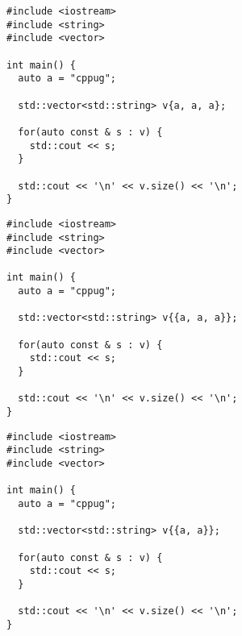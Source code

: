 \begin{frame}[fragile]
  \begin{lstlisting}
#include <iostream>
#include <string>
#include <vector>

int main() {
  auto a = "cppug";

  std::vector<std::string> v{a, a, a};

  for(auto const & s : v) {
    std::cout << s;
  }

  std::cout << '\n' << v.size() << '\n';
}
  \end{lstlisting}
\end{frame}
\begin{frame}[fragile]
  \begin{lstlisting}
#include <iostream>
#include <string>
#include <vector>

int main() {
  auto a = "cppug";

  std::vector<std::string> v{{a, a, a}};

  for(auto const & s : v) {
    std::cout << s;
  }

  std::cout << '\n' << v.size() << '\n';
}
  \end{lstlisting}
\end{frame}
\begin{frame}[fragile]
  \begin{lstlisting}
#include <iostream>
#include <string>
#include <vector>

int main() {
  auto a = "cppug";

  std::vector<std::string> v{{a, a}};

  for(auto const & s : v) {
    std::cout << s;
  }

  std::cout << '\n' << v.size() << '\n';
}
  \end{lstlisting}
\end{frame}
